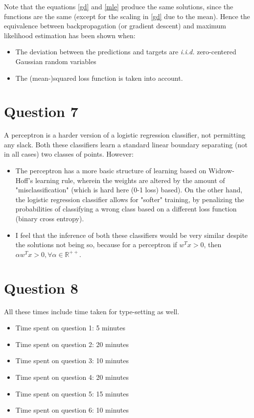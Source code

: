 \documentclass{article}
\begin{document}
\begin{flushleft}
Note that the equations \ref{gd} and \ref{mle} produce the same solutions, since the functions are the same (except for the scaling in \ref{gd} due to the mean). Hence the equivalence between backpropagation (or gradient descent) and maximum likelihood estimation has been shown when:
\begin{itemize}
\item The deviation between the predictions and targets are \textit{i.i.d.} zero-centered Gaussian random variables
\item The (mean-)squared loss function is taken into account.
\end{itemize}
\end{flushleft}

\section*{Question 7}
A perceptron is a harder version of a logistic regression classifier, not permitting any slack. Both these classifiers learn a standard linear boundary separating (not in all cases) two classes of points. However:
\begin{itemize}
\item The perceptron has a more basic structure of learning based on Widrow-Hoff's learning rule, wherein the weights are altered by the amount of "misclassification" (which is hard here (0-1 loss) based). On the other hand, the logistic regression classifier allows for "softer" training, by penalizing the probabilities of classifying a wrong class based on a different loss function (binary cross entropy).
\item I feel that the inference of both these classifiers would be very similar despite the solutions not being so, because for a perceptron if \(w^{T} x > 0\), then \(\alpha w^{T} x > 0, \forall \alpha \in \mathbb{R}^{++}\).
\end{itemize}

\section*{Question 8}
All these times include time taken for type-setting as well.
\begin{itemize}
\item Time spent on question 1: 5 minutes
\item Time spent on question 2: 20 minutes
\item Time spent on question 3: 10 minutes
\item Time spent on question 4: 20 minutes
\item Time spent on question 5: 15 minutes
\item Time spent on question 6: 10 minutes
\end{itemize}
\end{document}
